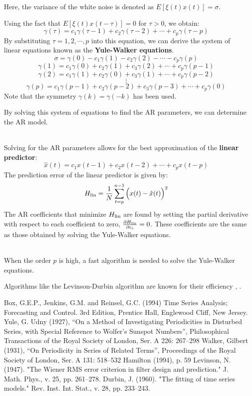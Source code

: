 \documentclass[uplatex,a4j,12pt,dvipdfmx]{jsarticle}
\begin{document}
Here, the variance of the white noise is denoted as $E[\xi(t)x(t)]=\sigma$.

Using the fact that $E[\xi(t)x(t-\tau)]=0$ for $\tau>0$, we obtain:
\[
	\gamma(\tau) = c_{1} \gamma(\tau-1) + c_{2} \gamma(\tau-2) + \cdots + c_{p} \gamma(\tau-p)
\]
By substituting $\tau=1,2,\cdots,p$ into this equation, we can derive the system of linear equations known as the \textbf{Yule-Walker equations}.
\[
	\sigma = \gamma(0) - c_{1} \gamma(1) - c_{2} \gamma(2) - \cdots - c_{p} \gamma(p)
\]
\[
	\gamma(1) = c_{1} \gamma(0) + c_{2} \gamma(1) + c_{3} \gamma(2) + \cdots + c_{p} \gamma(p-1)
\]
\[
	\gamma(2) = c_{1} \gamma(1) + c_{2} \gamma(0) + c_{3} \gamma(1) + \cdots + c_{p} \gamma(p-2)
\]
\[
	\vdots
\]
\[
	\gamma(p) = c_{1} \gamma(p-1) + c_{2} \gamma(p-2) + c_{3} \gamma(p-3) + \cdots + c_{p} \gamma(0)
\]
Note that the symmetry $\gamma(k)=\gamma(-k)$ has been used.

By solving this system of equations to find the AR parameters, we can determine the AR model.

\ \\

Solving for the AR parameters allows for the best approximation of the \textbf{linear predictor}:
\[
	\hat{x}(t) = c_{1} x(t-1) + c_{2} x(t-2) + \cdots + c_{p} x(t-p)
\]
The prediction error of the linear predictor is given by:
\[
	H_{\rm lin} = \frac{1}{N} \sum^{n-1}_{t=p} \Big( x(t) - \hat{x}(t) \Big)^{2}
\]
The AR coefficients that minimize $H_{\rm lin}$ are found by setting the partial derivative with respect to each coefficient to zero, $\frac{\partial H_{\rm lin}}{ \partial c_{i}} = 0$. These coefficients are the same as those obtained by solving the Yule-Walker equations.

\ \\

When the order $p$ is high, a fast algorithm is needed to solve the Yule-Walker equations.

Algorithms like the Levinson-Durbin algorithm are known for their efficiency \cite{Levinson1947}, \cite{Durbin1960}.


\begin{thebibliography}{9}
	 Box, G.E.P., Jenkins, G.M. and Reinsel, G.C. (1994) Time Series Analysis; Forecasting and Control. 3rd Edition, Prentice Hall, Englewood Cliff, New Jersey.
	 Yule, G. Udny (1927), “On a Method of Investigating Periodicities in Disturbed Series, with Special Reference to Wolfer's Sunspot Numbers”, Philosophical Transactions of the Royal Society of London, Ser. A 226: 267–298
	 Walker, Gilbert (1931), “On Periodicity in Series of Related Terms”, Proceedings of the Royal Society of London, Ser. A 131: 518–532 Hamilton (1994), p. 59
	 Levinson, N. (1947). "The Wiener RMS error criterion in filter design and prediction." J. Math. Phys., v. 25, pp. 261–278.
	 Durbin, J. (1960). "The fitting of time series models." Rev. Inst. Int. Stat., v. 28, pp. 233–243.

\end{thebibliography}
\end{document}

